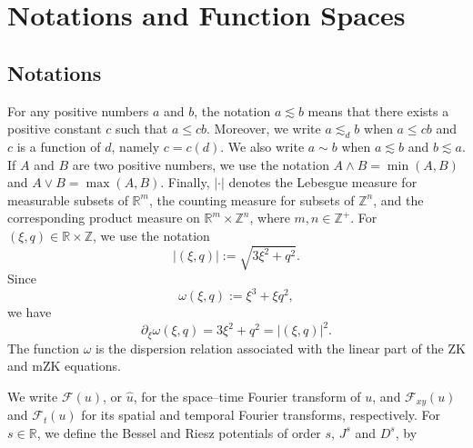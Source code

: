 \documentclass[12pt,oneside,reqno]{amsart}
\numberwithin{equation}{section}
\theoremstyle{plain}
\def\R{{\mathbb R}}
\def\Z{{\mathbb Z}}
\def\cF{{\mathcal F}}
\newcommand{\abs}[1]{%
    \left|#1\right|%
}
\def\pt{\partial}
\newcommand{\Ft}{\mathcal{F}_t}
\newcommand{\Fxy}{\mathcal{F}_{xy}}
\begin{document}
\section{Notations and Function Spaces}
\label{sec:function-space}
\subsection{Notations}
\label{sec:notations}
For any positive numbers $a$ and $b$, the notation $a \lesssim b$ means that there exists a positive constant $c$ such that $a \leq cb$. Moreover, we write $a \lesssim_d b$ when $a\leq c b$ and $c$ is a function of $d$, namely $c=c(d)$. We also write $a \sim b$ when $a \lesssim b$ and $b \lesssim a$. If $A$ and $B$ are two positive numbers, we use the notation $A \land B = \min(A, B)$ and $A \lor B = \max(A, B)$. Finally, $|\cdot|$ denotes the Lebesgue measure for measurable subsets of $\R^m$, the counting measure for subsets of $\Z^n$, and the corresponding product measure on $\R^m\times\Z^n$, where $m,n\in\Z^+$. For $(\xi,q)\in\R\times\Z$, we use the notation
\begin{equation}
    \abs{(\xi,q)}
    :=
    \sqrt{3\xi^2+q^2}.
\end{equation}
Since
\begin{equation}
    \omega(\xi,q)
    :=
    \xi^3+\xi q^2,
\end{equation}
we have
\begin{equation}
    \pt_\xi\omega(\xi,q)
    =
    3\xi^2+q^2
    =
    \abs{(\xi,q)}^2.
\end{equation}
The function $\omega$ is the dispersion relation associated with the
linear part of the ZK and mZK equations.

We write $\cF(u)$, or $\hat u$, for the space--time Fourier transform of $u$,
and $\Fxy(u)$ and $\Ft(u)$ for its spatial and temporal Fourier transforms,
respectively. For $s\in\R$, we define the Bessel and Riesz potentials of
order $s$, $J^s$ and $D^s$, by
\end{document}

